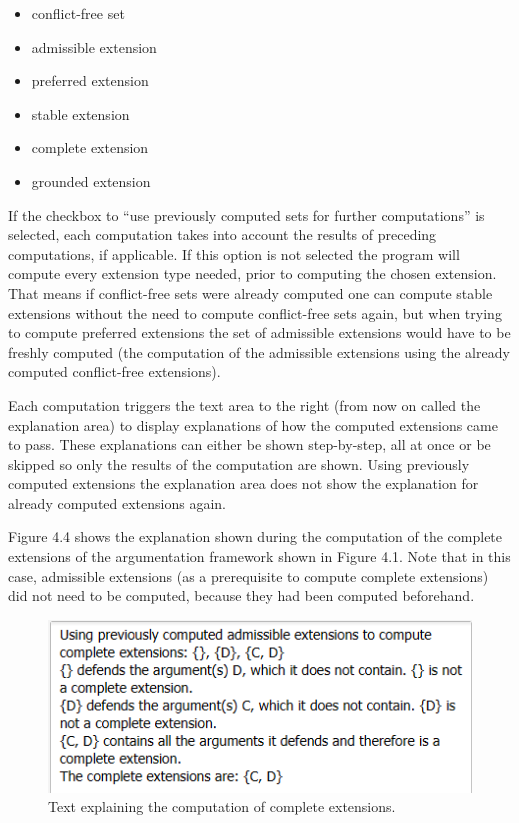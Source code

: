 \documentclass[draft,final]{vutinfth} %
\newcommand{\hl}{\par\vspace{6pt}} %
\begin{document}
\begin{itemize}[noitemsep]
	\item conflict-free set
	\item admissible extension
	\item preferred extension
	\item stable extension
	\item complete extension
	\item grounded extension
\end{itemize}

If the checkbox to ``use previously computed sets for further computations'' is selected, each computation takes into account the results of preceding computations, if applicable. If this option is not selected the program will compute every extension type needed, prior to computing the chosen extension.\\
That means if conflict-free sets were already computed one can compute stable extensions without the need to compute conflict-free sets again, but when trying to compute preferred extensions the set of admissible extensions would have to be freshly computed (the computation of the admissible extensions using the already computed conflict-free extensions).\hl
Each computation triggers the text area to the right (from now on called the explanation area) to display explanations of how the computed extensions came to pass. These explanations can either be shown step-by-step, all at once or be skipped so only the results of the computation are shown. Using previously computed extensions the explanation area does not show the explanation for already computed extensions again.\hl
Figure 4.4 shows the explanation shown during the computation of the complete extensions of the argumentation framework shown in Figure 4.1. Note that in this case, admissible extensions (as a prerequisite to compute complete extensions) did not need to be computed, because they had been computed beforehand.

\FloatBarrier
	\begin{figure}[!h]
		\centering
		\includegraphics{pics/explanation.png}
		\caption{Text explaining the computation of complete extensions.}
	\end{figure}
\FloatBarrier
\end{document}
